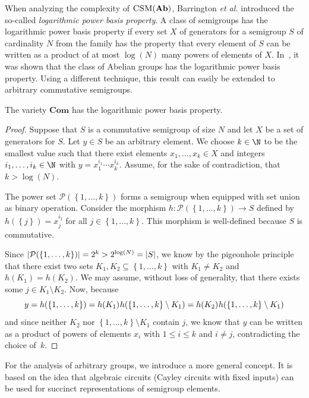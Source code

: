 \documentclass{toc}
\renewcommand{\leq}{\leqslant}
\renewcommand{\le}{\leq}
\newcommand{\abs}[1]{\ensuremath\left|#1\right|}
\newcommand{\os}[1]{\ensuremath{\left\{#1\right\}}}
\newcommand{\vAb}{\mathbf{Ab}}
\newcommand{\vCom}{\mathbf{Com}}
\newcommand{\CSM}{\ensuremath{\textsc{CSM}}}
\newcommand{\SLPBP}{logarithmic power basis property}
\newcommand{\ms}{\hspace*{0.5pt}}
\begin{document}
When analyzing the complexity of $\CSM(\vAb)$, Barrington {\it et al.}
introduced the so-called \emph{\SLPBP}. A class of semigroups has the {\SLPBP}
if %
every set $X$ of generators  %
for a semigroup $S$ of cardinality $N$ from the
family has the property that every element of $S$ can be written as a product
of at most $\log(N)$ many powers of elements of $X$.
%
In~\cite{BarringtonKLM01}, it was shown that the class of Abelian groups has
the {\SLPBP}. Using a different technique, this result can easily be extended to
arbitrary commutative semigroups.

\begin{lemma}
  The variety $\vCom$ has the {\SLPBP}.
  \label{lem:com}
\end{lemma}
%
\begin{proof}
  Suppose that $S$ is a commutative semigroup of size $N$ and let $X$ be a set
  of generators for $S$.
  Let $y \in S$ be an arbitrary element.
  We choose $k \in \N$ to be the smallest value such that there exist elements
  $x_1, \dots, x_k \in X$ and integers $i_1, \dots, i_k \in \N$ with $y =
  x_1^{i_1} \cdots x_k^{i_k}$.
  Assume, for the sake of contradiction, that $k > \log(N)$.

  The power set $\mathcal{P}(\os{1, \dots, k})$ forms a semigroup when equipped
  with set union as binary operation.
  Consider the morphism $h \colon \mathcal{P}(\os{1, \dots, k}) \to S$ defined
  by $h(\os{j}) = x_j^{i_j}$ for all $j \in \os{1, \dots, k}$. This morphism is
  well-defined because $S$ is commutative.

  Since $\abs{\mathcal{P}(\os{1, \dots, k})} = 2^k > 2^{\log(N)} = \abs{S}$, we
  know by the pigeonhole principle that there exist two sets $K_1, K_2
  \subseteq \os{1, \dots, k}$ with $K_1 \ne K_2$ and $h(K_1) = h(K_2)$. We may
  assume, without loss of generality, that there exists some $j \in K_1
  \setminus K_2$.
  Now, because
  \begin{equation*}
    y = h(\os{1, \dots, k}) = h(K_1) \ms h(\os{1, \dots, k} \setminus K_1) = h(K_2) \ms h(\os{1, \dots, k} \setminus K_1)
  \end{equation*}
  and since neither $K_2$ nor $\os{1, \dots, k} \setminus K_1$ contain $j$, we
  know that $y$ can be written as a product of powers of elements $x_i$ with $1
  \le i \le k$ and $i \ne j$, contradicting the choice of~$k$.
\end{proof}

For the analysis of arbitrary groups, we introduce a more general concept. It
is based on the idea that algebraic circuits (Cayley circuits with fixed
inputs) can be used for succinct representations of semigroup elements.
\end{document}
